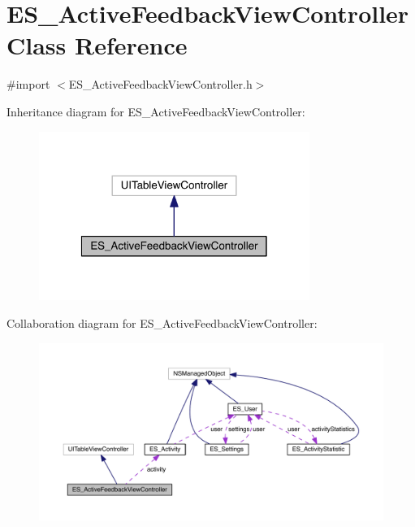 \hypertarget{interface_e_s___active_feedback_view_controller}{\section{E\+S\+\_\+\+Active\+Feedback\+View\+Controller Class Reference}
\label{interface_e_s___active_feedback_view_controller}
}


{\ttfamily \#import $<$E\+S\+\_\+\+Active\+Feedback\+View\+Controller.\+h$>$}



Inheritance diagram for E\+S\+\_\+\+Active\+Feedback\+View\+Controller\+:\nopagebreak
\begin{figure}[H]
\begin{center}
\leavevmode
\includegraphics[width=250pt]{d7/dd9/interface_e_s___active_feedback_view_controller__inherit__graph}
\end{center}
\end{figure}


Collaboration diagram for E\+S\+\_\+\+Active\+Feedback\+View\+Controller\+:\nopagebreak
\begin{figure}[H]
\begin{center}
\leavevmode
\includegraphics[width=350pt]{dd/dbb/interface_e_s___active_feedback_view_controller__coll__graph}
\end{center}
\end{figure}
